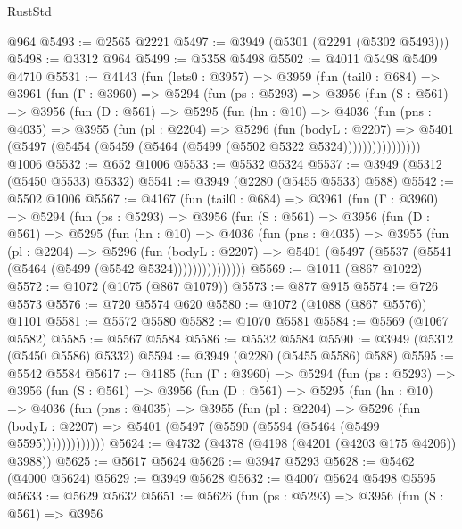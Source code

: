 \begin{lexlean}{RustStd}
\begin{coremodule}
    @964
@5493 := @2565 @2221
@5497 := @3949 (@5301 (@2291 (@5302 @5493)))
@5498 := @3312 @964
@5499 := @5358 @5498
@5502 := @4011 @5498 @5409 @4710
@5531 := @4143
    (fun (lets0 : @3957) =>
    @3959
      (fun (tail0 : @684) =>
      @3961
        (fun (Γ : @3960) =>
        @5294
          (fun (ps : @5293) =>
          @3956
            (fun (S : @561) =>
            @3956
              (fun (D : @561) =>
              @5295
                (fun (hn : @10) =>
                @4036
                  (fun (pns : @4035) =>
                  @3955
                    (fun (pl : @2204) =>
                    @5296
                      (fun (bodyL : @2207) =>
                      @5401 (@5497 (@5454 (@5459 (@5464 (@5499 (@5502 @5322 @5324))))))))))))))))
    @1006
@5532 := @652 @1006
@5533 := @5532 @5324
@5537 := @3949 (@5312 (@5450 @5533) @5332)
@5541 := @3949 (@2280 (@5455 @5533) @588)
@5542 := @5502 @1006
@5567 := @4167
    (fun (tail0 : @684) =>
    @3961
      (fun (Γ : @3960) =>
      @5294
        (fun (ps : @5293) =>
        @3956
          (fun (S : @561) =>
          @3956
            (fun (D : @561) =>
            @5295
              (fun (hn : @10) =>
              @4036
                (fun (pns : @4035) =>
                @3955
                  (fun (pl : @2204) =>
                  @5296
                    (fun (bodyL : @2207) =>
                    @5401 (@5497 (@5537 (@5541 (@5464 (@5499 (@5542 @5324)))))))))))))))
@5569 := @1011 (@867 @1022)
@5572 := @1072 (@1075 (@867 @1079))
@5573 := @877 @915
@5574 := @726 @5573
@5576 := @720 @5574 @620
@5580 := @1072 (@1088 (@867 @5576)) @1101
@5581 := @5572 @5580
@5582 := @1070 @5581
@5584 := @5569 (@1067 @5582)
@5585 := @5567 @5584
@5586 := @5532 @5584
@5590 := @3949 (@5312 (@5450 @5586) @5332)
@5594 := @3949 (@2280 (@5455 @5586) @588)
@5595 := @5542 @5584
@5617 := @4185
    (fun (Γ : @3960) =>
    @5294
      (fun (ps : @5293) =>
      @3956
        (fun (S : @561) =>
        @3956
          (fun (D : @561) =>
          @5295
            (fun (hn : @10) =>
            @4036
              (fun (pns : @4035) =>
              @3955
                (fun (pl : @2204) =>
                @5296
                  (fun (bodyL : @2207) =>
                  @5401 (@5497 (@5590 (@5594 (@5464 (@5499 @5595)))))))))))))
@5624 := @4732 (@4378 (@4198 (@4201 (@4203 @175 @4206)) @3988))
@5625 := @5617 @5624
@5626 := @3947 @5293
@5628 := @5462 (@4000 @5624)
@5629 := @3949 @5628
@5632 := @4007 @5624 @5498 @5595
@5633 := @5629 @5632
@5651 := @5626
    (fun (ps : @5293) =>
    @3956
      (fun (S : @561) =>
      @3956

\end{coremodule}
\end{lexlean}
